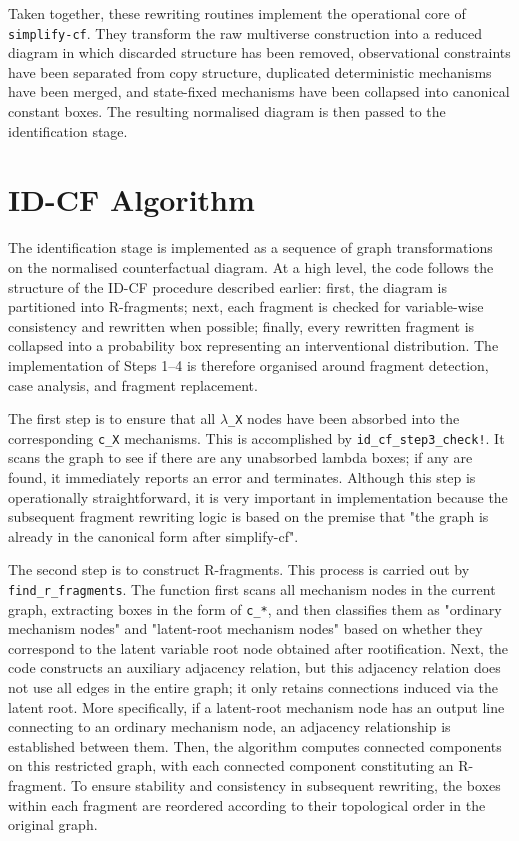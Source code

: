 \documentclass[a4paper]{report}
\begin{document}
Taken together, these rewriting routines implement the operational core of \texttt{simplify-cf}. 
They transform the raw multiverse construction into a reduced diagram in which discarded structure has been removed, observational constraints have been separated from copy structure, duplicated deterministic mechanisms have been merged, and state-fixed mechanisms have been collapsed into canonical constant boxes. The resulting normalised diagram is then passed to the identification stage.

\section{ID-CF Algorithm}
The identification stage is implemented as a sequence of graph transformations on the normalised counterfactual diagram. 
At a high level, the code follows the structure of the ID-CF procedure described earlier: first, the diagram is partitioned into R-fragments; next, each fragment is checked for variable-wise consistency and rewritten when possible; finally, every rewritten fragment is collapsed into a probability box representing an interventional distribution. The implementation of Steps 1--4 is therefore organised around fragment detection, case analysis, and fragment replacement.


The first step is to ensure that all \texttt{$\lambda$\_X} nodes have been absorbed into the corresponding \texttt{c\_X} mechanisms. This is accomplished by \texttt{id\_cf\_step3\_check!}. It scans the graph to see if there are any unabsorbed lambda boxes; if any are found, it immediately reports an error and terminates. Although this step is operationally straightforward, it is very important in implementation because the subsequent fragment rewriting logic is based on the premise that "the graph is already in the canonical form after simplify-cf".


The second step is to construct R-fragments. This process is carried out by \texttt{find\_r\_fragments}. The function first scans all mechanism nodes in the current graph, extracting boxes in the form of \texttt{c\_*}, and then classifies them as "ordinary mechanism nodes" and "latent-root mechanism nodes" based on whether they correspond to the latent variable root node obtained after rootification. Next, the code constructs an auxiliary adjacency relation, but this adjacency relation does not use all edges in the entire graph; it only retains connections induced via the latent root. More specifically, if a latent-root mechanism node has an output line connecting to an ordinary mechanism node, an adjacency relationship is established between them. Then, the algorithm computes connected components on this restricted graph, with each connected component constituting an R-fragment. To ensure stability and consistency in subsequent rewriting, the boxes within each fragment are reordered according to their topological order in the original graph.
\end{document}
